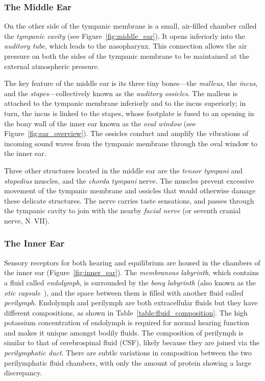 \subsubsection{The Middle Ear}

On the other side of the tympanic membrane is a small, air-filled chamber called
the \emph{tympanic cavity} (see Figure~\ref{fig:middle_ear}). It opens
inferiorly into the \emph{auditory tube}, which leads to the nasopharynx. This
connection allows the air pressure on both the sides of the tympanic membrane to
be maintained at the external atmospheric pressure.

The key feature of the middle ear is its three tiny bones---the \emph{malleus},
the \emph{incus}, and the \emph{stapes}---collectively known as the
\emph{auditory ossicles}. The malleus is attached to the tympanic membrane
inferiorly and to the incus superiorly; in turn, the incus is linked to the
stapes, whose footplate is fused to an opening in the bony wall of the inner ear
known as the \emph{oval window} (see Figure~\ref{fig:ear_overview}). The
ossicles conduct and amplify the vibrations of incoming sound waves from the
tympanic membrane through the oval window to the inner ear.

Three other structures located in the middle ear are the \emph{tensor tympani}
and \emph{stapedius} muscles, and the \emph{chorda tympani} nerve. The muscles
prevent excessive movement of the tympanic membrane and ossicles that would
otherwise damage these delicate structures. The nerve carries taste sensations,
and passes through the tympanic cavity to join with the nearby \emph{facial
nerve} (or seventh cranial nerve, N~VII).

\subsubsection{The Inner Ear}

Sensory receptors for both hearing and equilibrium are housed in the chambers of
the inner ear (Figure~\ref{fig:inner_ear}). The \emph{membranous labyrinth},
which contains a fluid called \emph{endolymph}, is surrounded by the \emph{bony
labyrinth} (also known as the \emph{otic capsule}~\cite[p. 62]{jahn2001}), and
the space between them is filled with another fluid called \emph{perilymph}.
Endolymph and perilymph are both extracellular fluids but they have different
compositions, as shown in Table~\ref{table:fluid_composition}. The high
potassium concentration of endolymph is required for normal hearing function and makes it
unique amongst bodily fluids. The composition of perilymph is similar to that of
cerebrospinal fluid (CSF), likely because they are joined via the
\emph{perilymphatic duct}. There are subtle variations in composition between
the two perilymphatic fluid chambers, with only the amount of protein showing a
large discrepancy.

